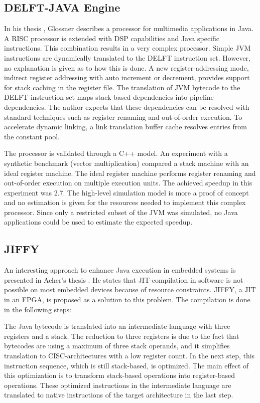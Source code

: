 \subsection{DELFT-JAVA Engine}

In his thesis \cite{DELFT}, Glossner describes a processor for
multimedia applications in Java. A RISC processor is extended with
DSP capabilities and Java specific instructions. This combination
results in a very complex processor. Simple JVM instructions are
dynamically translated to the DELFT instruction set. However, no
explanation is given as to how this is done. A new
register-addressing mode, indirect register addressing with auto
increment or decrement, provides support for stack caching in the
register file. The translation of JVM bytecode to the DELFT
instruction set maps stack-based dependencies into pipeline
dependencies. The author expects that these dependencies can be
resolved with standard techniques such as register renaming and
out-of-order execution. To accelerate dynamic linking, a link
translation buffer cache resolves entries from the constant pool.


The processor is validated through a C++ model. An experiment with a
synthetic benchmark (vector multiplication) compared a stack machine
with an ideal register machine. The ideal register machine performs
register renaming and out-of-order execution on multiple execution
units. The achieved speedup in this experiment was 2.7. The
high-level simulation model is more a proof of concept and no
estimation is given for the resources needed to implement this
complex processor. Since only a restricted subset of the JVM was
simulated, no Java applications could be used to estimate the
expected speedup.


\subsection{JIFFY}

An interesting approach to enhance Java execution in embedded
systems is presented in Acher's thesis \cite{JIFFY}. He states that
JIT-compilation in software is not possible on most embedded devices
because of resource constraints. JIFFY, a JIT in an FPGA, is
proposed as a solution to this problem. The compilation is done in
the following steps:

The Java bytecode is translated into an intermediate language with
three registers and a stack. The reduction to three registers is due
to the fact that bytecodes are using a maximum of three stack
operands, and it simplifies translation to CISC-architectures with a
low register count. In the next step, this instruction sequence,
which is still stack-based, is optimized. The main effect of this
optimization is to transform stack-based operations into
register-based operations. These optimized instructions in the
intermediate language are translated to native instructions of the
target architecture in the last step.

